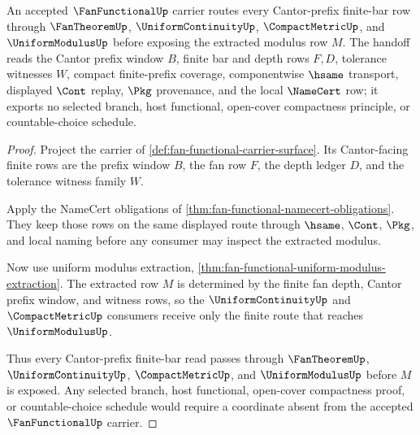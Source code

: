 \begin{theorem}
\label{thm:fan-functional-cantor-prefix-modulus-handoff}
An accepted $\FanFunctionalUp$ carrier routes every Cantor-prefix finite-bar row through $\FanTheoremUp$, $\UniformContinuityUp$, $\CompactMetricUp$, and $\UniformModulusUp$ before exposing the extracted modulus row $M$. The handoff reads the Cantor prefix window $B$, finite bar and depth rows $F,D$, tolerance witnesses $W$, compact finite-prefix coverage, componentwise $\hsame$ transport, displayed $\Cont$ replay, $\Pkg$ provenance, and the local $\NameCert$ row; it exports no selected branch, host functional, open-cover compactness principle, or countable-choice schedule.
\end{theorem}
\begin{proof}
Project the carrier of \autoref{def:fan-functional-carrier-surface}. Its Cantor-facing finite rows are the prefix window $B$, the fan row $F$, the depth ledger $D$, and the tolerance witness family $W$.

Apply the NameCert obligations of \autoref{thm:fan-functional-namecert-obligations}. They keep those rows on the same displayed route through $\hsame$, $\Cont$, $\Pkg$, and local naming before any consumer may inspect the extracted modulus.

Now use uniform modulus extraction, \autoref{thm:fan-functional-uniform-modulus-extraction}. The extracted row $M$ is determined by the finite fan depth, Cantor prefix window, and witness rows, so the $\UniformContinuityUp$ and $\CompactMetricUp$ consumers receive only the finite route that reaches $\UniformModulusUp$.

Thus every Cantor-prefix finite-bar read passes through $\FanTheoremUp$, $\UniformContinuityUp$, $\CompactMetricUp$, and $\UniformModulusUp$ before $M$ is exposed. Any selected branch, host functional, open-cover compactness proof, or countable-choice schedule would require a coordinate absent from the accepted $\FanFunctionalUp$ carrier.
\end{proof}

